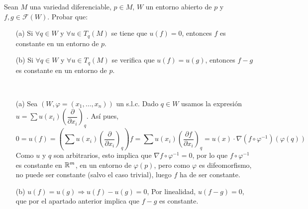 \documentclass[twoside]{article}
\begin{document}
\begin{ejercicio}{2}
Sean $M$ una variedad diferenciable, $p \in M$, $W$ un entorno abierto de $p$ y
$f,g \in \mathcal{F}(W)$. Probar que:

\begin{itemize}
\item[(a)] Si $\forall q \in W$ y $\forall u \in  T_q(M)$ se tiene que $u(f) = 0$, entonces $f$ es constante
en un entorno de $p$.
\item[(b)] Si $\forall q \in W$ y $\forall u \in T_q(M)$ se verifica que $u(f) = u(g)$, entonces $f - g$ es
constante en un entorno de $p$.
\end{itemize}
\end{ejercicio}
\begin{solucion}\
\begin{itemize}
\item[(a)] Sea $(W,\varphi=(x_1,\dots,x_n))$ un s.l.c. Dado $q\in W$ usamos la expresión $u = \sum u(x_i) \left(\dfrac{\partial}{\partial x_i}\right)_q$. Así pues, 
\[
0=u(f) = \left(\sum u(x_i) \left(\dfrac{\partial}{\partial x_i}\right)_q\right)f=\sum u(x_i) \left(\frac{\partial f}{\partial x_i}\right)_q = u(x)\cdot\nabla(f\circ\varphi^{-1})(\varphi(q))
\]
Como $u$ y $q$ son arbitrarios, esto implica que $\nabla f\circ\varphi^{-1}=0$, por lo que $f \circ \varphi^{-1}$ es constante en $\mathbb{R}^m$, en un entorno de $\varphi(p)$, pero como $\varphi$ es difeomorfismo, no puede ser constante (salvo el caso trivial), luego $f$ ha de ser constante. 
\item[(b)] $u(f) = u(g)\Rightarrow u(f)-u(g)=0$, Por linealidad, $u(f-g)=0$, que por el apartado anterior implica que $f-g$ es constante.
\end{itemize}
\end{solucion}

\newpage
\end{document}
